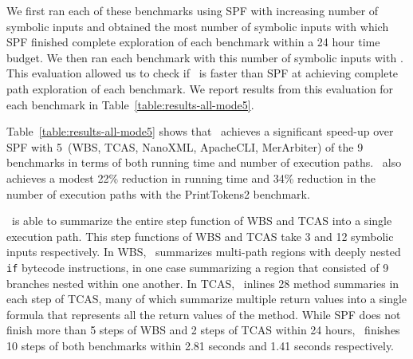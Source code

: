 We first ran each of these benchmarks using SPF with increasing number of symbolic inputs and obtained the most number
of symbolic inputs with which SPF finished complete exploration of each benchmark within a 24 hour time budget.
%
We then ran each benchmark with this number of symbolic inputs with \tool.
%
This evaluation allowed us to check if \tool\ is faster than SPF at achieving complete path exploration of each benchmark.
%
%
We report results from this evaluation for each benchmark in Table~\ref{table:results-all-mode5}.
%
%

%

%
Table~\ref{table:results-all-mode5} shows that \tool\ achieves a significant speed-up over SPF with
5~(WBS, TCAS, NanoXML, ApacheCLI, MerArbiter) of the 9 benchmarks in terms of both running time and number of
execution paths.
%
\tool\ also achieves a modest 22\% reduction in running time and 34\% reduction
in the number of execution paths with the PrintTokens2 benchmark.

\tool\ is able to summarize the entire step function of WBS and TCAS into a single execution path.
%
This step functions of WBS and TCAS take 3 and 12 symbolic inputs respectively.
%
In WBS, \tool\ summarizes multi-path regions with deeply nested {\tt if} bytecode instructions, in one case
summarizing a region that consisted of 9 branches nested within one another.
%
In TCAS, \tool\ inlines 28 method summaries in each step of TCAS, many of which summarize multiple return values
into a single formula that represents all the return values of the method.
%
While SPF does not finish more than 5 steps of WBS and 2 steps of TCAS within 24 hours, \tool\ finishes 10 steps of both
benchmarks within 2.81 seconds and 1.41 seconds respectively.

